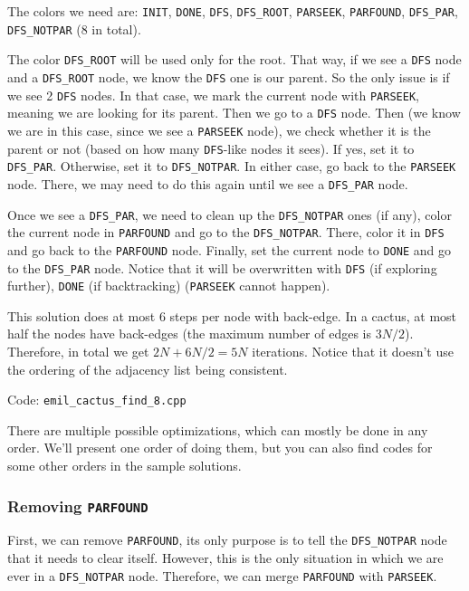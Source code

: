\documentclass{article}
\begin{document}
The colors we need are: \verb|INIT|, \verb|DONE|, \verb|DFS|, \verb|DFS_ROOT|, \verb|PARSEEK|, \verb|PARFOUND|, \verb|DFS_PAR|, \verb|DFS_NOTPAR| (8 in total).

The color \verb|DFS_ROOT| will be used only for the root. That way, if we see a \verb|DFS| node and a \verb|DFS_ROOT| node, we know the \verb|DFS| one is our parent. So the only issue is if we see 2 \verb|DFS| nodes. In that case, we mark the current node with \verb|PARSEEK|, meaning we are looking for its parent. Then we go to a \verb|DFS| node. Then (we know we are in this case, since we see a \verb|PARSEEK| node), we check whether it is the parent or not (based on how many \verb|DFS|-like nodes it sees). If yes, set it to \verb|DFS_PAR|. Otherwise, set it to \verb|DFS_NOTPAR|. In either case, go back to the \verb|PARSEEK| node. There, we may need to do this again until we see a \verb|DFS_PAR| node.

Once we see a \verb|DFS_PAR|, we need to clean up the \verb|DFS_NOTPAR| ones (if any), color the current node in \verb|PARFOUND| and go to the \verb|DFS_NOTPAR|. There, color it in \verb|DFS| and go back to the \verb|PARFOUND| node. Finally, set the current node to \verb|DONE| and go to the \verb|DFS_PAR| node. Notice that it will be overwritten with \verb|DFS| (if exploring further), \verb|DONE| (if backtracking) (\verb|PARSEEK| cannot happen).

This solution does at most $6$ steps per node with back-edge. In a cactus, at most half the nodes have back-edges (the maximum number of edges is $3N/2$). Therefore, in total we get $2N + 6N/2 = 5N$ iterations. Notice that it doesn't use the ordering of the adjacency list being consistent.

Code: \verb|emil_cactus_find_8.cpp|

There are multiple possible optimizations, which can mostly be done in any order. We'll present one order of doing them, but you can also find codes for some other orders in the sample solutions.

\subsubsection{Removing \texttt{PARFOUND}}

First, we can remove \verb|PARFOUND|, its only purpose is to tell the \verb|DFS_NOTPAR| node that it needs to clear itself. However, this is the only situation in which we are ever in a \verb|DFS_NOTPAR| node. Therefore, we can merge \verb|PARFOUND| with \verb|PARSEEK|.
\end{document}

